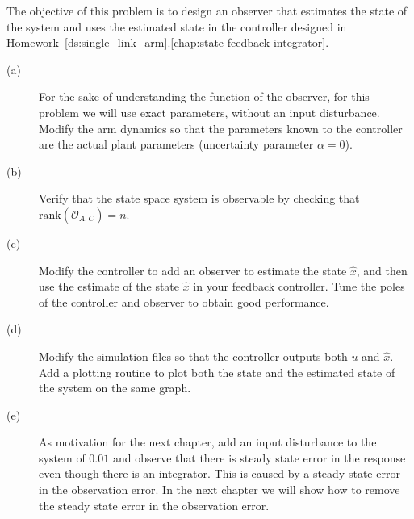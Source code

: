
The objective of this problem is to design an observer that estimates the state of the system and uses the estimated state in the controller designed in Homework~\ref{ds:single_link_arm}.\ref{chap:state-feedback-integrator}.

\begin{description}\item[]
\item[(a)] For the sake of understanding the function of the observer, for this problem we will use exact parameters, without an input disturbance.  Modify the arm dynamics so that the parameters known to the controller are the actual plant parameters (uncertainty parameter $\alpha=0$).
\item[(b)] Verify that the state space system is observable by checking that $\text{rank}(\mathcal{O}_{A,C})=n$.
\item[(c)] Modify the controller to add an observer to estimate the state $\hat{x}$, and then use the estimate of the state $\hat{x}$ in your feedback controller.  Tune the poles of the controller and observer to obtain good performance.  
\item[(d)] Modify the simulation files so that the controller outputs both $u$ and $\hat{x}$.  Add a plotting routine to plot both the state and the estimated state of the system on the same graph.
\item[(e)] As motivation for the next chapter, add an input disturbance to the system of $0.01$ and observe that there is steady state error in the response even though there is an integrator.  This is caused by a steady state error in the observation error.  In the next chapter we will show how to remove the steady state error in the observation error.
\end{description}
